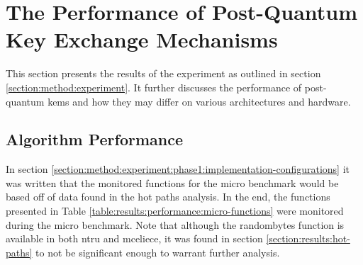 \section{The Performance of Post-Quantum Key Exchange Mechanisms}

This section presents the results of the experiment as outlined in section \ref{section:method:experiment}. It further discusses the performance of \gls{post-quantum} \glspl{kem} and how they may differ on various architectures and hardware.

\subsection{Algorithm Performance}

In section \ref{section:method:experiment:phase1:implementation-configurations} it was written that the monitored functions for the micro benchmark would be based off of data found in the hot paths analysis. In the end, the functions presented in Table \ref{table:results:performance:micro-functions} were monitored during the micro benchmark. Note that although the randombytes function is available in both \gls{ntru} and \gls{mceliece}, it was found in section \ref{section:results:hot-paths} to not be significant enough to warrant further analysis.

